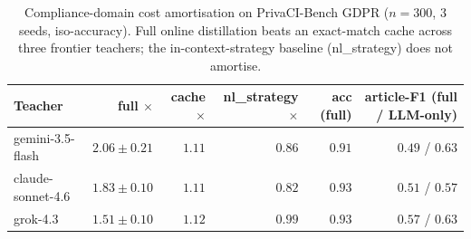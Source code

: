\begin{table}[t]\centering
\small
\caption{Compliance-domain cost amortisation on PrivaCI-Bench GDPR ($n{=}300$, 3 seeds, iso-accuracy). Full online distillation beats an exact-match cache across three frontier teachers; the in-context-strategy baseline (nl\_strategy) does not amortise.}
\label{tab:privaci}
\begin{tabular}{lrrrrr}
\toprule
Teacher & full $\times$ & cache $\times$ & nl\_strategy $\times$ & acc (full) & article-F1 (full / LLM-only) \\
\midrule
gemini-3.5-flash & $2.06\pm0.21$ & $1.11$ & $0.86$ & $0.91$ & $0.49$ / $0.63$ \\
claude-sonnet-4.6 & $1.83\pm0.10$ & $1.11$ & $0.82$ & $0.93$ & $0.51$ / $0.57$ \\
grok-4.3 & $1.51\pm0.10$ & $1.12$ & $0.99$ & $0.93$ & $0.57$ / $0.63$ \\
\bottomrule
\end{tabular}
\end{table}
